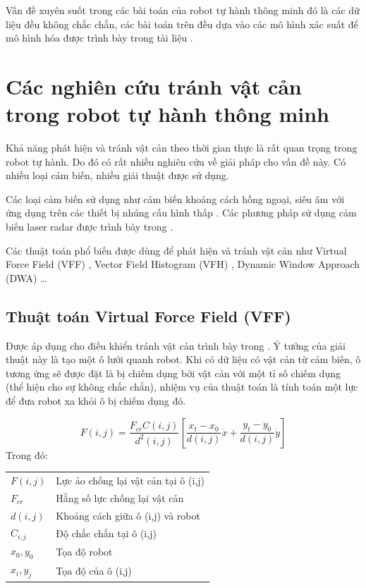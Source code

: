 Vấn đề xuyên suốt trong các bài toán của robot tự hành thông minh đó là các dữ liệu đều không chắc chắn, các bài toán trên đều dựa vào các mô hình xác suất để mô hình hóa được trình bày trong tài liệu \cite{Sebastian2005}.


\section{Các nghiên cứu tránh vật cản trong robot tự hành thông minh}
\label{sec:tranhVatCan_ref}

Khả năng phát hiện và tránh vật cản theo thời gian thực là rất quan trọng trong robot tự hành. Do đó có rất nhiều nghiên cứu về giải pháp cho vấn đề này. Có nhiều loại cảm biến, nhiều giải thuật được sử dụng. 

Các loại cảm biến sử dụng như cảm biến khoảng cách hồng ngoại, siêu âm với ứng dụng trên các thiết bị nhúng cấu hình thấp \cite{dongyue2013, Susnea2009}. Các phương pháp sử dụng cảm biến laser radar được trình bày trong \cite{Gao2019, Wu2015, Peng2015,Baras2019}. 

Các thuật toán phổ biến được dùng để phát hiện và tránh vật cản như Virtual Force Field (VFF) \cite{Borenstein1989}, Vector Field Histogram (VFH) \cite{Borenstein1991}, Dynamic Window Approach (DWA) \cite{Fox1997}\ldots

\subsection{Thuật toán Virtual Force Field (VFF)}

Được áp dụng cho điều khiển tránh vật cản trình bày trong \cite{Borenstein1988,Borenstein1989}. Ý tưởng của giải thuật này là tạo một ô lưới quanh robot. Khi có dữ liệu có vật cản từ cảm biến, ô tương ứng sẽ được đặt là bị chiếm dụng bởi vật cản với một tỉ số chiếm dụng (thể hiện cho sự không chắc chắn), nhiệm vụ của thuật toán là tính toán một lực để đưa robot xa khỏi ô bị chiếm dụng đó.


\begin{equation}
  F(i,j) = \frac{{F}_{cr}C(i,j)}{{d}^{2}(i,j)}\left [\frac{{x}_{t}-{x}_{0}}{d(i,j)}\dot{x} + \frac{{y}_{t}-{y}_{0}}{d(i,j)}\dot{y} 
  \right ]
\end{equation}
Trong đó: 

\begin{tabular}{ll}
  $F(i,j)$      & Lực ảo chống lại vật cản tại ô (i,j) \\
  ${F}_{cr}$    & Hằng số lực chống lại vật cản  \\
  $d(i,j)$      & Khoảng cách giữa ô (i,j) và robot \\
  ${C}_{i,j}$   & Độ chắc chắn tại ô (i,j)  \\
  ${x}_{0}, {y}_{0}$ & Tọa độ robot \\
  ${x}_{i}, {y}_{j}$ & Tọa độ của ô (i,j)
\end{tabular}


